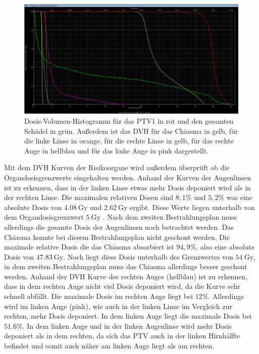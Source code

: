\begin{figure}[H]
  \centering
  \includegraphics[width=\textwidth]{Bilder/Teilhirn1_DVH.png}
  \caption{Dosis-Volumen-Histogramm für das PTV1 in rot und den gesamten Schädel in grün. Außerdem ist das DVH für das Chiasma in gelb, für die linke Linse in orange, für die rechte Linse in gelb, für das rechte Auge in hellblau und für das linke Auge in pink dargestellt.}
  \label{abb:DVH}
\end{figure}

Mit dem DVH Kurven der Risikoorgane wird außerdem überprüft ob die Organdosisgrenzwerte eingehalten werden.
Anhand der Kurven der Augenlinsen ist zu erkennen, dass in der linken Linse etwas mehr Dosis deponiert wird
als in der rechten Linse. Die maximalen relativen Dosen sind $8,1\%$ und $5,2\%$ was eine absolute Dosis von
$\SI{4.08}{\gray}$ und $\SI{2.62}{\gray}$ ergibt. Diese Werte liegen unterhalb von dem Organdosisgrenzwert
$\SI{5}{\gray}$ \cite{grenz}. Nach dem zweiten Bestrahlungsplan muss allerdings die gesamte Dosis der Augenlinsen noch betrachtet werden.
Das Chiasma konnte bei diesem Bestrahlungsplan nicht geschont werden. Die maximale relative Dosis die das Chiasma absorbiert ist
$94,9\%$, also eine absolute Dosis von $\SI{47.83}{\gray}$. Noch liegt diese Dosis unterhalb des Grenzwertes von
$\SI{54}{\gray}$, in dem zweiten Bestrahlungsplan muss das Chiasma allerdings besser geschont werden.
Anhand der DVH Kurve des rechten Auges (hellblau) ist zu erkennen, dass in dem rechten Auge nicht viel Dosis deponiert wird, da die Kurve sehr schnell
abfällt. Die maximale Dosis im rechten Auge liegt bei $12\%$. Allerdings wird im linken Auge (pink), wie auch in der linken Linse im Vergleich zur rechten,
mehr Dosis deponiert. In dem linken Auge liegt die maximale Dosis bei $51.6\%$. In dem linken
Auge und in der linken Augenlinse wird mehr Dosis deponiert als in dem rechten, da sich das
PTV auch in der linken Hirnhälfte befindet und somit auch näher am linken Auge liegt als am rechten.


